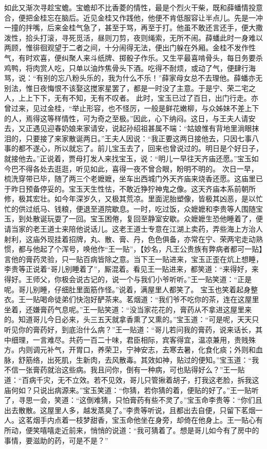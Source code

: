 \documentclass[12pt,oneside]{book}
\begin{document}
如此又渐次寻趁宝蟾。宝蟾却不比香菱的情性，最是个烈火干柴，既和薛蟠情投意合，便把金桂忘在脑后。近见金桂又作践他，他便不肯低服容让半点儿。先是一冲一撞的拌嘴，后来金桂气急了，甚至于骂，再至于打。他虽不敢还言还手，便大撒泼性，拾头打滚，寻死觅活，昼则刀剪，夜则绳索，无所不闹。薛蟠此时一身难以两顾，惟徘徊观望于二者之间，十分闹得无法，便出门躲在外厢。金桂不发作性气，有时欢喜，便纠聚人来斗纸牌、掷骰子作乐。又生平最喜啃骨头，每日务要杀鸡鸭，将肉赏人吃，只单以油炸焦骨头下酒。吃得不耐烦，或动了气，便肆行海骂，说：“有别的忘八粉头乐的，我为什么不乐！”薛家母女总不去理他。薛蟠亦无别法，惟日夜悔恨不该娶这搅家星罢了，都是一时没了主意。于是宁、荣二宅之人，上上下下，无有不知，无有不叹者。
此时，宝玉已过了百日，出门行走。亦曾过来，见过金桂，“举止形容，也不怪厉，一般是鲜花嫩柳，与众姊妹不差上下的人，焉得这等样情性，可为奇之至极。”因此，心下纳闷。这日，与王夫人请安去，又正遇见迎春奶娘来家请安，说起孙绍祖甚属不端：“姑娘惟有背地里淌眼抹泪的，只要接了来家散诞两日。”王夫人因说：“我正要这两日接他去，只因七事八事的都不遂心，所以就忘了。前儿宝玉去了，回来也曾说过的。明日是个好日子，就接他去。”正说着，贾母打发人来找宝玉，说：“明儿一早往天齐庙还愿。”宝玉如今巴不得各处去逛逛，听见如此，喜得一夜不曾合眼，盼明不明的。
次日一早，梳洗穿带已毕，随了两三个老嬷嬷，坐车出西城门外天齐庙来烧香还愿。这庙里已于昨日预备停妥的。宝玉天生性怯，不敢近狰狞神鬼之像。这天齐庙本系前朝所修，极其宏壮。如今年深岁久，又极其荒凉。里面泥胎塑像，皆极其凶恶，是以忙忙的供过纸马、钱粮，便退至道院歇息。一时，吃过饭，众嬷嬷和李贵等人围随宝玉，到处散诞玩耍了一回。宝玉困倦，复回至静室安歇。众嬷嬷生恐他睡着了，便请当家的老王道士来陪他说话儿。这老王道士专意在江湖上卖药，弄些海上方治人射利，这庙外现挂着招牌，丸、散、膏、丹，色色俱备，亦常在宁、荣两宅走动熟惯，都与他起了个浑号，唤他作“王一贴”，【妙名，凡王公贵族有弊病者都可一贴】言他的膏药灵验，只一贴百病皆除之意。当下王一贴进来，宝玉正歪在炕上想睡，李贵等正说着“哥儿别睡着了”，厮混着。看见王一贴进来，都笑道：“来得好，来得好。王师父，你极会说古记的，说一个与我们小爷听听。”王一贴笑道：“正是呢。哥儿别睡，仔细肚里面筋作怪。”说着，满屋里人都笑了。
宝玉也笑着起身整衣。王一贴喝命徒弟们快泡好酽茶来。茗烟道：“我们爷不吃你的茶，连在这屋里坐着，还嫌膏药气息呢。”王一贴笑道：“没当家花花的，膏药从不拿进这屋里来的。知道哥儿今日必来，头三五天就拿香熏了又熏的。”宝玉道：“可是呢，天天只听见你的膏药好，到底治什么病？”王一贴道：“哥儿若问我的膏药，说来话长，其中细理，一言难尽。共药一百二十味，君臣相际，宾客得宜，温凉兼用，贵贱殊方。内则调元补气，开胃口，养荣卫，宁神安志，去寒去暑，化食化痰；外则和血脉，舒筋络，出死肌，生新肉，去风散毒。其效如神，贴过的便知。”宝玉道：“我不信一张膏药就治这些病。我且问你，倒有一种病，可也贴得好么？”王一贴道：“百病千灾，无不立效。若不见效，哥儿只管揪着胡子，打我这老脸，拆我这庙何如？只说出病源来。”宝玉笑道：“你猜，若你猜的着，便贴的好了。”王一贴听了，寻思一会，笑道：“这倒难猜，只怕膏药有些不灵了。”宝玉命李贵等：“你们且出去散散。这屋里人多，越发蒸臭了。”李贵等听说，且都出去自便，只留下茗烟一人。这茗烟手内点着一枝梦甜香，宝玉命他坐在身旁，却倚在他身上。王一贴心有所动，便笑嘻嘻走近前来，悄悄的说道：“我可猜着了。想是哥儿如今有了房中的事情，要滋助的药，可是不是？”
\end{document}
